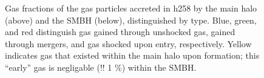 \documentclass[manuscript]{aastex}
\begin{document}
\begin{figure}
\centerline{}
\centerline{}
\caption[]{Gas fractions of the gas particles accreted in h258 by the main halo (above) and the SMBH (below), distinguished by type. Blue, green, and red distinguish gas gained through unshocked gas, gained through mergers, and gas shocked upon entry, respectively. Yellow indicates gas that existed within the main halo upon formation; this ``early'' gas is negligable (!! 1 \%) within the SMBH.}
\label{h277piefrac} 
\end{figure}
\end{document}
